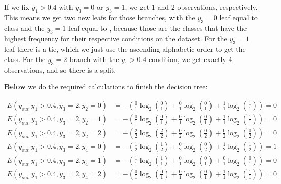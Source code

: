 \documentclass[12pt]{article}
\begin{document}
\begin{enumerate}[leftmargin=\labelsep]
    If we fix $y_1 > 0.4$ with $y_3 = 0$ or $y_3 = 1$, we get 1 and 2 observations, respectively. This means we get two new leafs for those branches, with
    the $y_3 = 0$ leaf equal to class  and the $y_3 = 1$ leaf equal to , because those are the classes that have the highest frequency for
    their respective conditions on the dataset. For the $y_3 = 1$ leaf there is a tie, which we just use the ascending alphabetic order to get the class.
    For the $y_3 = 2$ branch with the $y_1 > 0.4$ condition, we get exactly 4 observations, and so there is a split.

    \textbf{Below} we do the required calculations to finish the decision tree:

    \[
        \begin{aligned}
            E(y_{out} | y_1 > 0.4 , y_3 = 2 , y_2 = 0) & = - \left(\frac{0}{1} \log_2\left(\frac{0}{1}\right) + \frac{0}{1} \log_2\left(\frac{0}{1}\right)
                + \frac{1}{1} \log_2\left(\frac{1}{1}\right)\right) = 0                                                                          \\
            E(y_{out} | y_1 > 0.4 , y_3 = 2 , y_2 = 1) & = - \left(\frac{0}{1} \log_2\left(\frac{0}{1}\right) + \frac{0}{1} \log_2\left(\frac{0}{1}\right)
                + \frac{1}{1} \log_2\left(\frac{1}{1}\right)\right) = 0                                                                          \\
            E(y_{out} | y_1 > 0.4 , y_3 = 2 , y_2 = 2) & = - \left(\frac{2}{2} \log_2\left(\frac{2}{2}\right) + \frac{0}{2} \log_2\left(\frac{0}{2}\right)
                + \frac{0}{2} \log_2\left(\frac{0}{2}\right)\right) = 0                                                                          \\
            E(y_{out} | y_1 > 0.4 , y_3 = 2 , y_4 = 0) & = - \left(\frac{1}{2} \log_2\left(\frac{1}{2}\right) + \frac{0}{2} \log_2\left(\frac{0}{2}\right)
                + \frac{1}{2} \log_2\left(\frac{1}{2}\right)\right) = 1                                                                          \\
            E(y_{out} | y_1 > 0.4 , y_3 = 2 , y_4 = 1) & = - \left(\frac{1}{1} \log_2\left(\frac{1}{1}\right) + \frac{0}{1} \log_2\left(\frac{0}{1}\right)
                + \frac{0}{1} \log_2\left(\frac{0}{1}\right)\right) = 0                                                                          \\
            E(y_{out} | y_1 > 0.4 , y_3 = 2 , y_4 = 2) & = - \left(\frac{0}{1} \log_2\left(\frac{0}{1}\right) + \frac{0}{1} \log_2\left(\frac{0}{1}\right)
                + \frac{1}{1} \log_2\left(\frac{1}{1}\right)\right) = 0
        \end{aligned}
    \]


\end{enumerate}
\end{document}
